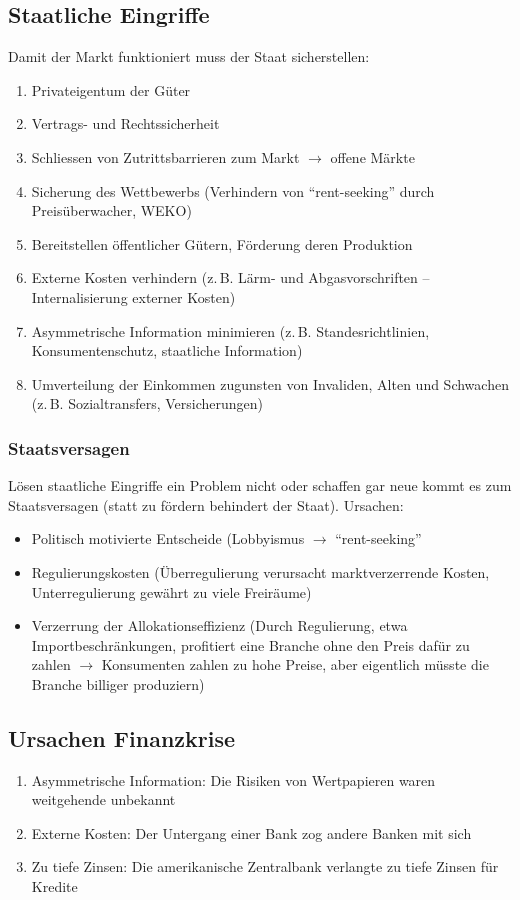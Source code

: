 \subsection{Staatliche Eingriffe}
Damit der Markt funktioniert muss der Staat sicherstellen:
\begin{enumerate}\itemsep0em
	\item Privateigentum der Güter
	\item Vertrags- und Rechtssicherheit
	\item Schliessen von Zutrittsbarrieren zum Markt $\rightarrow$ offene Märkte
	\item Sicherung des Wettbewerbs (Verhindern von \enquote{rent-seeking} durch Preisüberwacher, WEKO)
	\item Bereitstellen öffentlicher Gütern, Förderung deren Produktion
	\item Externe Kosten verhindern (z.\,B. Lärm- und Abgasvorschriften -- Internalisierung externer Kosten) 
	\item Asymmetrische Information minimieren (z.\,B. Standesrichtlinien, Konsumentenschutz, staatliche Information)
	\item Umverteilung der Einkommen zugunsten von Invaliden, Alten und Schwachen (z.\,B. Sozialtransfers, Versicherungen)
\end{enumerate}

\subsubsection{Staatsversagen}
Lösen staatliche Eingriffe ein Problem nicht oder schaffen gar neue kommt es zum Staatsversagen (statt zu fördern behindert der Staat). Ursachen:
\begin{itemize}\itemsep0em
	\item Politisch motivierte Entscheide (Lobbyismus $\rightarrow$ \enquote{rent-seeking}
	\item Regulierungskosten (Überregulierung verursacht marktverzerrende Kosten, Unterregulierung gewährt zu viele Freiräume)
	\item Verzerrung der Allokationseffizienz (Durch Regulierung, etwa Importbeschränkungen, profitiert eine Branche ohne den Preis dafür zu zahlen $\rightarrow$ Konsumenten zahlen zu hohe
	Preise, aber eigentlich müsste die Branche billiger produziern)
\end{itemize}

\subsection{Ursachen Finanzkrise}
\begin{enumerate}\itemsep0em
	\item Asymmetrische Information: Die Risiken von Wertpapieren waren weitgehende unbekannt
	\item Externe Kosten: Der Untergang einer Bank zog andere Banken mit sich
	\item Zu tiefe Zinsen: Die amerikanische Zentralbank verlangte zu tiefe Zinsen für Kredite
\end{enumerate}

